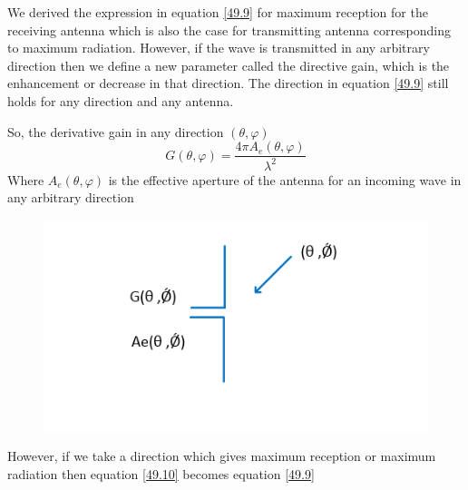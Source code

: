 We derived the expression in equation \ref{49.9} for maximum reception for the receiving antenna which is also the case for transmitting antenna corresponding to maximum radiation. However, if the wave is transmitted in any arbitrary direction then we define a new parameter called the directive gain, which is the enhancement or decrease in that direction. The direction in equation \ref{49.9} still holds for any direction and any antenna.

So, the derivative gain in any direction $(\theta, \varphi)$ 
\begin{equation}
\label{49.10}
G(\theta, \varphi)=\dfrac{4 \pi A_{e}(\theta, \varphi)}{\lambda^{2}}
\end{equation}
Where $A_{e}(\theta, \varphi)$ is the effective aperture of the antenna for an incoming wave in any arbitrary direction
\begin{figure}[h]
\centering
\includegraphics[width=1\linewidth]{./graphics/fig52_7}
\caption{}
\label{fig 1}	
\end{figure}

However, if we take a direction which gives maximum reception or maximum radiation then equation \ref{49.10} becomes equation \ref{49.9}

